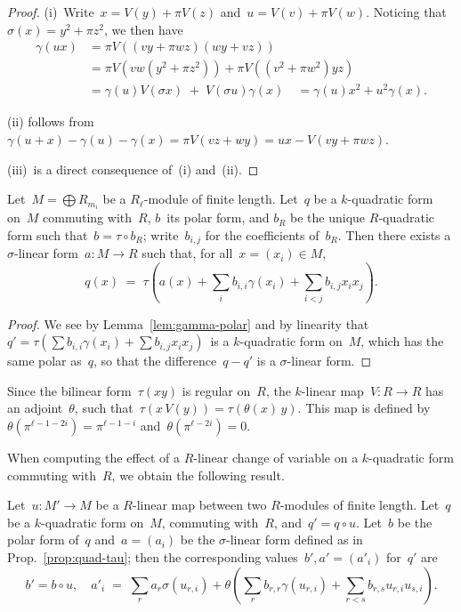 \documentclass{lms}
\def\pa#1{\left(#1\right)}
\begin{document}
\begin{proof}
(i)~Write~$x = V(y) + π V(z)$ and~$u = V(v) + π V(w)$. Noticing
that~$σ(x) = y^2 + π z^2$, we then have
\begin{equation}\label{eq:gamma-prod}
\begin{split}
γ(ux) &= π V\pa{(vy + π wz)(wy+vz)}\\
 &= π V\pa{vw (y^2 + π z^2)} + π V \pa{(v^2+πw^2) yz}\\
 &= γ(u) V(σx) \;+\; V(σu) γ(x) \quad = γ(u) x^2 + u^2 γ(x).
\end{split}
\end{equation}

(ii) follows from
$γ(u+x) - γ(u) - γ(x) = π V(vz + wy) = ux - V(vy+πwz)$.

(iii)~is a direct consequence of~(i) and~(ii).
\end{proof}
\begin{prop}\label{prop:quad-tau}
Let~$M = ⨁ R_{m_i}$ be a $R_ℓ$-module of finite length.
Let~$q$ be a $k$-quadratic form on~$M$ commuting with~$R$, $b$~its
polar form, and $b_R$ be the unique $R$-quadratic form such that~$b = τ ∘
b_R$; write~$b_{i,j}$ for the coefficients of~$b_R$.
Then there exists a $σ$-linear form~$a: M → R$ such that, for all~$x =
(x_i) ∈ M$,
\begin{equation}
q(x) \;=\; τ\pa{a(x) + ∑_{i} b_{i,i} γ(x_i) + ∑_{i < j} b_{i,j} x_i x_j}.
\end{equation}
\end{prop}

\begin{proof}
We see by Lemma~\ref{lem:gamma-polar} and by linearity that
$q' = τ(∑ b_{i,i} γ(x_i) + ∑ b_{i,j} x_i x_j)$~is a $k$-quadratic form on~$M$,
which has the same polar as~$q$,
so that the difference~$q - q'$ is a $σ$-linear form.
\end{proof}

Since the bilinear form~$τ(x y)$ is regular on~$R$, the $k$-linear
map~$V: R → R$ has an adjoint~$θ$, such that~$τ(x\, V(y)) = τ(θ(x)\, y)$.
This map is defined by~$θ(π^{ℓ-1-2i}) = π^{ℓ-1-i}$ and~$θ(π^{ℓ-2i}) = 0$.

When computing the effect of a $R$-linear change of variable on a
$k$-quadratic form commuting with~$R$, we obtain the following result.

\begin{prop}\label{prop:quad-changevar}
Let~$u: M' → M$ be a $R$-linear map between two $R$-modules of finite length.
Let~$q$ be a $k$-quadratic form on~$M$, commuting with~$R$, and~$q' = q ∘ u$.
Let~$b$ be the polar form of~$q$ and~$a = (a_i)$ be the $σ$-linear form defined
as in Prop.~\ref{prop:quad-tau}; then the corresponding values~$b', a' =
(a'_i)$
for~$q'$ are
\begin{equation*}
b' = b ∘ u, \quad
a'_i \;=\; ∑_r a_r σ(u_{r,i})
  + θ \pa{ ∑_r b_{r,r} γ(u_{r,i}) + ∑_{r < s} b_{r,s} u_{r,i} u_{s,i} }.
\end{equation*}
\end{prop}
\end{document}
